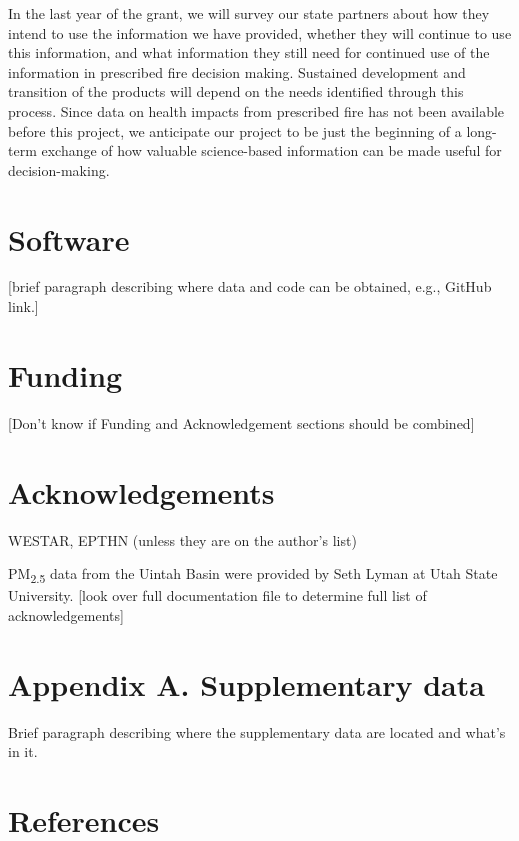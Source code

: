 \documentclass[authoryear]{elsarticle}
\begin{document}
In the last year of the grant, we will survey our state partners about how they intend to use the information we have provided, whether they will continue to use this information, and what information they still need for continued use of the information in prescribed fire decision making. Sustained development and transition of the products will depend on the needs identified through this process. Since data on health impacts from prescribed fire has not been available before this project, we anticipate our project to be just the beginning of a long-term exchange of how valuable science-based information can be made useful for decision-making. 

\section{Software}

[brief paragraph describing where data and code can be obtained, e.g., GitHub link.]

\section*{Funding}

[Don't know if Funding and Acknowledgement sections should be combined]

\section*{Acknowledgements}

WESTAR, EPTHN (unless they are on the author's list)

PM\textsubscript{2.5} data from the Uintah Basin were provided by Seth Lyman at Utah State University. [look over full documentation file to determine full list of acknowledgements]


\section*{Appendix A. Supplementary data}

Brief paragraph describing where the supplementary data are located and what's in it.





\section*{References}

%



\end{document}
